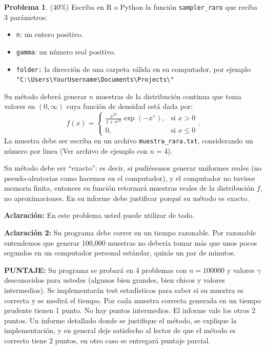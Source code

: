 \documentclass[a4paper,12 pt]{article}
\theoremstyle{definition}
\newtheorem{problema}{Problema}
\begin{document}
\begin{problema} (40\%)
Escriba en R o Python la función \texttt{sampler\_raro} que reciba 3 parámetros: \begin{itemize}
	\item \texttt{n}: un entero positivo.
	\item \texttt{gamma}: un número real positivo.
	\item \texttt{folder:} la dirección de una carpeta válida en su computador, por ejemplo\\ \texttt{"C:\textbackslash Users\textbackslash YourUsername\textbackslash Documents\textbackslash Projects\textbackslash"}
\end{itemize}

Su método deberá generar $n$ muestras de la distribución continua que toma valores en $(0,\infty)$ cuya función de densidad está dada por:
$$f(x) = \begin{cases} \frac{x^10}{1+x^10}\exp(-x^{\gamma}),&\text{si }x>0\\
0, & \text{si }x\leq 0\end{cases}.$$
La muestra debe ser escriba en un archivo \texttt{muestra\_rara.txt}, considerando un número por linea (Ver archivo de ejemplo con $n=4$).

Su método debe ser ``exacto'': es decir, si pudiésemos generar uniformes reales (no pseudo-aleatorias como hacemos en el computador), y el computador no tuviese memoria finita, entonces su función retornará muestras reales de la distribución $f$, no aproximaciones. En su informe debe justificar porqué su método es exacto.

\textbf{Aclaración:} En este problema usted puede utilizar de todo.

\textbf{Aclaración 2:} Su programa debe correr en un tiempo razonable. Por razonable entendemos que generar 100,000 muestras no debería tomar más que unos pocos segundos en un computador personal estándar, quizás un par de minutos.

\textbf{PUNTAJE:} Su programa se probará en 4 problemas con $n=100000$ y valores $\gamma$ desconocidos para ustedes (algunos bien grandes, bien chicos y valores intermedios). Se implementarán test estadísticos para saber si su muestra es correcta y se medirá el tiempo. Por cada muestra correcta generada en un tiempo prudente tienen 1 punto. No hay puntos intermedios. El informe vale los otros 2 puntos. Un informe detallado donde se justifique el método, se explique la implementación, y en general deje satisfecho al lector de que el método es correcto tiene 2 puntos, en otro caso se entregará puntaje parcial.
\end{problema}
\end{document}

